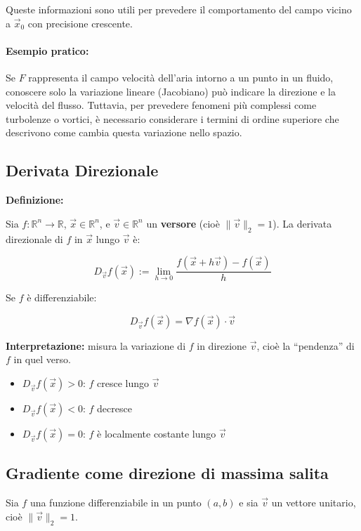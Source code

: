 \documentclass[12pt,a4paper]{article}
\begin{document}
Queste informazioni sono utili per prevedere il comportamento del campo vicino a \( \vec{x}_0 \) con precisione crescente. 

\paragraph{Esempio pratico:}

Se \( F \) rappresenta il campo velocità dell'aria intorno a un punto in un fluido, conoscere solo la variazione lineare (Jacobiano) può indicare la direzione e la velocità del flusso. Tuttavia, per prevedere fenomeni più complessi come turbolenze o vortici, è necessario considerare i termini di ordine superiore che descrivono come cambia questa variazione nello spazio.

\subsection*{Derivata Direzionale}

\textbf{Definizione:}

Sia \( f: \mathbb{R}^n \to \mathbb{R} \), \( \vec{x} \in \mathbb{R}^n \), e \( \vec{v} \in \mathbb{R}^n \) un \textbf{versore} (cioè \( \|\vec{v}\|_2 = 1 \)). La derivata direzionale di \( f \) in \( \vec{x} \) lungo \( \vec{v} \) è:

\[
D_{\vec{v}} f(\vec{x}) := \lim_{h \to 0} \frac{f(\vec{x} + h \vec{v}) - f(\vec{x})}{h}
\]

Se \( f \) è differenziabile:

\[
D_{\vec{v}} f(\vec{x}) = \nabla f(\vec{x}) \cdot \vec{v}
\]

\textbf{Interpretazione:} misura la variazione di \( f \) in direzione \( \vec{v} \), cioè la “pendenza” di \( f \) in quel verso.
\begin{itemize}
\item \( D_{\vec{v}} f(\vec{x}) > 0 \): \( f \) cresce lungo \( \vec{v} \)  
\item \( D_{\vec{v}} f(\vec{x}) < 0 \): \( f \) decresce  
\item \( D_{\vec{v}} f(\vec{x}) = 0 \): \( f \) è localmente costante lungo \( \vec{v} \)
\end{itemize}
\subsection*{Gradiente come direzione di massima salita}
Sia \( f \) una funzione differenziabile in un punto \((a,b)\) e sia \(\vec{v}\) un vettore unitario, cioè \(\|\vec{v}\|_2 = 1\).
\end{document}
